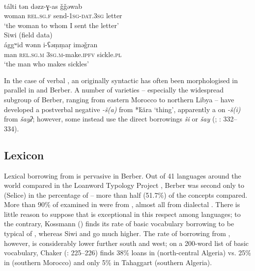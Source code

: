 \documentclass[output=paper]{langsci/langscibook}
\begin{document}
\ea
{}\\
\gll tálti tən dəzz-ɣ{}-as ǧǧəwab\\
woman \textsc{rel.sg.f} send-\textsc{1sg-dat.3sg} letter\\
\glt `the woman to whom I sent the letter' \\
\ex 
{ Siwi (field data)}\\
\gll ággʷid wənn i-ʕəṃṃaṛ iməǧran\\
man \textsc{rel.sg.m} \textsc{3sg.m}{}-make.\textsc{ipfv} sickle.\textsc{pl}\\
\glt `the man who makes sickles' 
\z

In the case of verbal , an originally syntactic  has often been morphologised in parallel in  and Berber. A number of varieties – especially the widespread  subgroup of Berber, ranging from eastern Morocco to northern Libya – have developed a postverbal negative  \textit{-š(a)} from {*\'{k}ăra} `thing', apparently a  on  \textit{-š(i)} from \textit{šayʔ}; however, some instead use the direct borrowings \textit{ši} or \textit{šay} (\citealt{Lucas2007}; \citealt{Kossmann2013book}: 332–334).


 
 \subsection{Lexicon}


Lexical borrowing from  is pervasive in Berber. Out of 41 languages around the world compared in the Loanword Typology Project \citep{Tadmor2009},  Berber was second only to (Selice)  in the percentage of  – more than half (51.7\%) of the concepts compared. More than 90\% of  examined in  were from , almost all from dialectal  .  There is little reason to suppose that  is exceptional in this respect among  languages; to the contrary, Kossmann (\citeyear[110]{Kossmann2013book}) finds its rate of basic vocabulary borrowing to be typical of , whereas Siwi and  go much higher. The rate of borrowing from , however, is considerably lower further south and west; on a 200-word list of basic vocabulary, Chaker (\citeyear{Chaker1984}: 225–226) finds 38\%  loans in  (north-central Algeria) vs. 25\% in  (southern Morocco) and only 5\% in Tahaggart  (southern Algeria).
\end{document}
